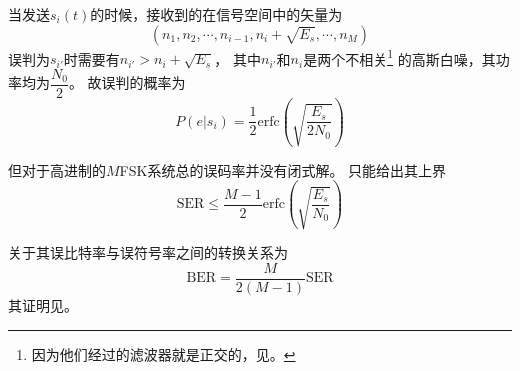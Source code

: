     当发送$s_i(t)$的时候，接收到的在信号空间中的矢量为
    \begin{equation*}
        ( n_1 , n_2 , \cdots , n_{i-1},n_i+\sqrt{E_s} ,\cdots ,n_M)
    \end{equation*}
    误判为$s_{i'}$时需要有$n_{i'}>n_i+\sqrt{E_s}$，
    其中$n_{i'}$和$n_i$是两个不相关\footnote{因为他们经过的滤波器就是正交的，见。}
    的高斯白噪，其功率均为$\dfrac{N_0}{2}$。
    故误判的概率为
    \begin{equation}
        P(e\vert s_i)=\frac{1}{2}\text{erfc}\left(\sqrt{\frac{E_s}{2N_0}}\right)    
    \end{equation}
    
    但对于高进制的$M$FSK系统总的误码率并没有闭式解。
    只能给出其上界
    \begin{equation}
        \text{SER}\leq \frac{M-1}{2}\text{erfc}\left(\sqrt{\frac{E_s}{N_0}}\right)
    \end{equation}

    关于其误比特率与误符号率之间的转换关系为
    \begin{equation}
        \text{BER}=\frac{M}{2(M-1)}\text{SER}
    \end{equation}
    其证明见。



    





